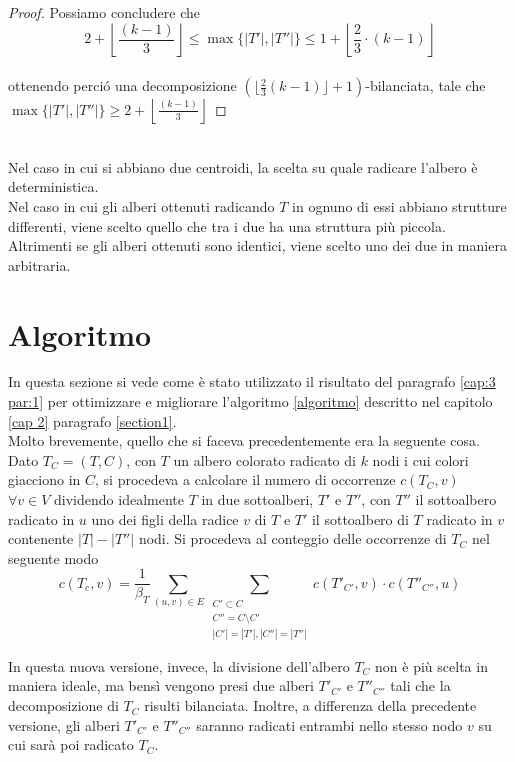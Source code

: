 \begin{proof}
Possiamo concludere che
\\

\[2 +  \left\lfloor \frac{(k-1)}{3}\right\rfloor \le \max\{|T'|,|T''|\} \le 1 + \left\lfloor \frac{2}{3} \cdot (k-1) \right\rfloor \]
 \\
ottenendo perci\'o una decomposizione $ (\lfloor \frac{2}{3}(k-1) \rfloor +1)$-bilanciata, tale che $ \max \{|T'|,|T''|\} \ge 2+ \left\lfloor \frac{(k-1)}{3}\right\rfloor $	 
 	 
\end{proof}\mbox{}\\
 
 	Nel caso in cui si abbiano due centroidi, la scelta su quale radicare l'albero  \`e deterministica.\\
 	Nel caso in cui gli alberi ottenuti radicando $ T $ in ognuno di essi abbiano strutture differenti, viene scelto quello che tra i due ha una struttura pi\`u piccola.
 	Altrimenti se gli alberi ottenuti sono identici, viene scelto uno dei due in maniera arbitraria.
 	
\section{Algoritmo}
\label{cap:3 par:2}
In questa sezione si vede come \`e stato utilizzato il risultato del paragrafo \ref{cap:3 par:1} per ottimizzare e migliorare l'algoritmo \ref{algoritmo} descritto nel capitolo \ref{cap 2} paragrafo \ref{section1}.\\
Molto brevemente, quello che si faceva precedentemente era la seguente cosa.
Dato $ T_C = (T,C) $, con $ T $ un albero colorato radicato di $ k $ nodi i cui colori giacciono in $ C $, si procedeva a calcolare il numero di occorrenze $ c(T_C,v) $ \ $ \forall v \in V $ dividendo idealmente $ T $ in due sottoalberi, $ T' $ e $ T'' $, con $ T'' $ il sottoalbero radicato in $ u $ uno dei figli della radice $ v $ di $ T $ e $ T'$ il sottoalbero di $ T $ radicato in $ v $ contenente $ |T | - |T'' | $ nodi. 
Si procedeva al conteggio delle occorrenze di $ T_C $ nel seguente modo
\[	c(T_c,v)=\frac{1}{\beta_T}\sum_{(u,v)\in E}\sum_{\substack{C' \subset C \\C'' = C \setminus C' \\ |C'|=|T'|, |C''| = |T''|}}c(T'_{C'},v)\cdot c(T''_{C''},u)\]   

In questa nuova versione, invece, la divisione dell'albero $ T_C $ non \`e pi\`u scelta in maniera ideale, ma bens\`i vengono presi due alberi $ T'_{C'} $ e $ T''_{C''} $ tali che la decomposizione di $ T_C $ risulti bilanciata.
Inoltre, a differenza della precedente versione, gli alberi $ T'_{C'} $ e $ T''_{C''} $ saranno radicati entrambi nello stesso nodo $ v $ su cui sar\`a poi radicato $ T_C $.



